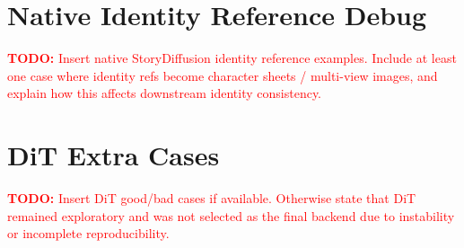 \documentclass[11pt,a4paper]{article}
\newcommand{\todo}[1]{\textcolor{red}{\textbf{TODO:} #1}}
\begin{document}
\section{Native Identity Reference Debug}

\todo{Insert native StoryDiffusion identity reference examples. Include at least one case where identity refs become character sheets / multi-view images, and explain how this affects downstream identity consistency.}

\section{DiT Extra Cases}

\todo{Insert DiT good/bad cases if available. Otherwise state that DiT remained exploratory and was not selected as the final backend due to instability or incomplete reproducibility.}
\end{document}
